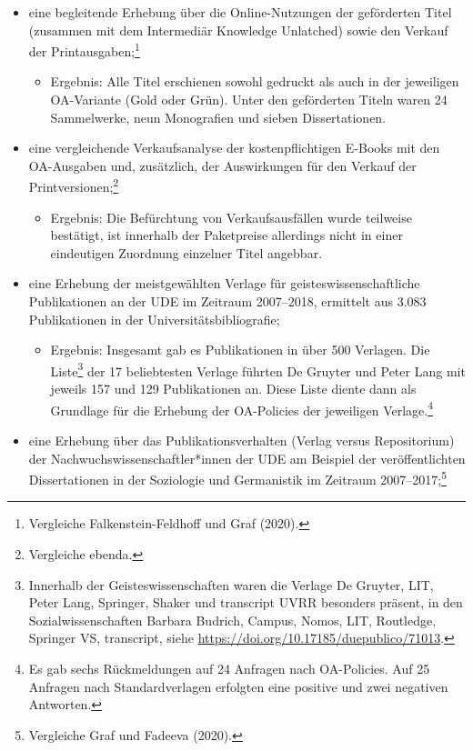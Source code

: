 \documentclass[a4paper,
fontsize=11pt,
oneside,
numbers=noperiodatend,
parskip=half-,
bibliography=totoc,
final
]{scrartcl}
\begin{document}
\begin{itemize}

\item
  eine begleitende Erhebung über die Online-Nutzungen der geförderten
  Titel (zusammen mit dem Intermediär Knowledge Unlatched) sowie den
  Verkauf der Printausgaben;\footnote{Vergleiche Falkenstein-Feldhoff
    und Graf (2020).}

  \begin{itemize}
  
  \item
    Ergebnis: Alle Titel erschienen sowohl gedruckt als auch in der
    jeweiligen OA-Variante (Gold oder Grün). Unter den geförderten
    Titeln waren 24 Sammelwerke, neun Monografien und sieben
    Dissertationen.
  \end{itemize}
\item
  eine vergleichende Verkaufsanalyse der kostenpflichtigen E-Books mit
  den OA-Ausgaben und, zusätzlich, der Auswirkungen für den Verkauf der
  Printversionen;\footnote{Vergleiche ebenda.}

  \begin{itemize}
  
  \item
    Ergebnis: Die Befürchtung von Verkaufsausfällen wurde teilweise
    bestätigt, ist innerhalb der Paketpreise allerdings nicht in einer
    eindeutigen Zuordnung einzelner Titel angebbar.
  \end{itemize}
\item
  eine Erhebung der meistgewählten Verlage für geisteswissenschaftliche
  Publikationen an der UDE im Zeitraum 2007--2018, ermittelt aus 3.083
  Publikationen in der Universitätsbibliografie;

  \begin{itemize}
  
  \item
    Ergebnis: Insgesamt gab es Publikationen in über 500 Verlagen. Die
    Liste\footnote{Innerhalb der Geisteswissenschaften waren die Verlage
      De Gruyter, LIT, Peter Lang, Springer, Shaker und transcript UVRR
      besonders präsent, in den Sozialwissenschaften Barbara Budrich,
      Campus, Nomos, LIT, Routledge, Springer VS, transcript, siehe
      \url{https://doi.org/10.17185/duepublico/71013}.} der 17
    beliebtesten Verlage führten De Gruyter und Peter Lang mit jeweils
    157 und 129 Publikationen an. Diese Liste diente dann als Grundlage
    für die Erhebung der OA-Policies der jeweiligen Verlage.\footnote{Es
      gab sechs Rückmeldungen auf 24 Anfragen nach OA-Policies. Auf 25
      Anfragen nach Standardverlagen erfolgten eine positive und zwei
      negativen Antworten.}
  \end{itemize}
\item
  eine Erhebung über das Publikationsverhalten (Verlag versus
  Repositorium) der Nachwuchswissenschaftler*innen der UDE am Beispiel
  der veröffentlichten Dissertationen in der Soziologie und Germanistik
  im Zeitraum 2007--2017;\footnote{Vergleiche Graf und Fadeeva (2020).}


\end{itemize}
\end{document}

